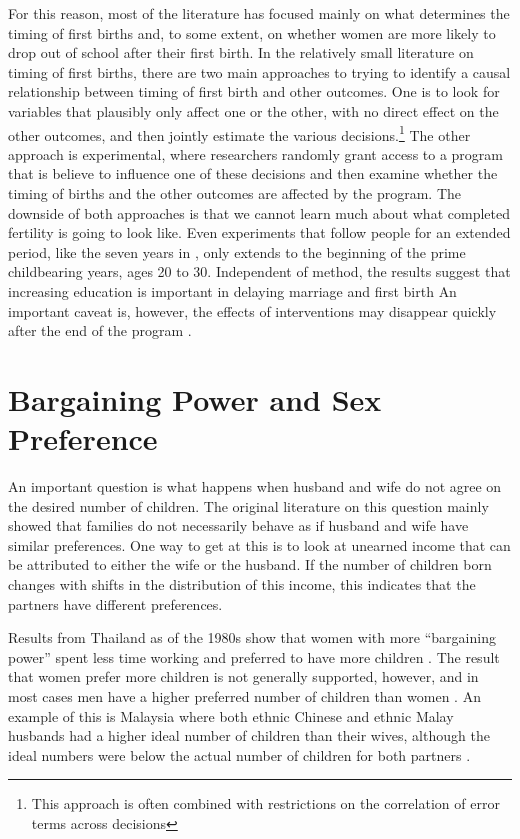 \documentclass[]{article}
\begin{document}
For this reason, most of the literature has focused mainly on what determines the timing of first births and, to some extent, on whether women are more likely to drop out of school after their first birth. In the relatively small literature on timing of first births, there are two main approaches to trying to identify a causal relationship between timing of first birth and other outcomes. One is to look for variables that plausibly only affect one or the other, with no direct effect on the other outcomes, and then jointly estimate the various decisions.\footnote{This approach is often combined with restrictions on the correlation of error terms across decisions} The other approach is experimental, where researchers randomly grant access to a program that is believe to influence one of these decisions and then examine whether the timing of births and the other outcomes are affected by the program. The downside of both approaches is that we cannot learn much about what completed fertility is going to look like. Even experiments that follow people for an extended period, like the seven years in \citet{Duflo2015}, only extends to the beginning of the prime childbearing years, ages 20 to 30. Independent of method, the results suggest that increasing education is important in delaying marriage and first birth \citep{Duflo2015,Marchetta2016} An important caveat is, however, the effects of interventions may disappear quickly after the end of the program \citep{Baird2016}.

\section{Bargaining Power and Sex Preference}\label{bargaining-power-and-sex-preference}

An important question is what happens when husband and wife do not agree on the desired number of children. The original literature on this question mainly showed that families do not necessarily behave as if husband and wife have similar preferences. One way to get at this is to look at unearned income that can be attributed to either the wife or the husband. If the number of children born changes with shifts in the distribution of this income, this indicates that the partners have different preferences.

Results from Thailand as of the 1980s show that women with more ``bargaining power'' spent less time working and preferred to have more children \citep{Schultz1990}. The result that women prefer more children is not generally supported, however, and in most cases men have a higher preferred number of children than women \citep{Westoff2010}. An example of this is Malaysia where both ethnic Chinese and ethnic Malay husbands had a higher ideal number of children than their wives, although the ideal numbers were below the actual number of children for both partners \citep{Rasul2008}.
\end{document}
